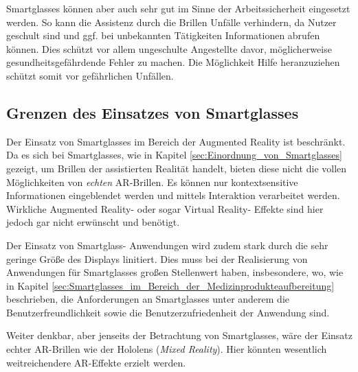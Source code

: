 Smartglasses können aber auch sehr gut im Sinne der Arbeitssicherheit eingesetzt werden. So kann die Assistenz durch die Brillen Unfälle verhindern, da Nutzer geschult sind und ggf. bei unbekannten Tätigkeiten Informationen abrufen können. Dies schützt vor allem ungeschulte Angestellte davor, möglicherweise gesundheitsgefährdende Fehler zu machen. Die Möglichkeit Hilfe heranzuziehen schützt somit vor gefährlichen Unfällen.
%
%
\subsection{Grenzen des Einsatzes von Smartglasses}
\label{sec:Grenzen_des_Einsatzes_von_Smartglasses}
Der Einsatz von Smartglasses im Bereich der Augmented Reality ist beschränkt. Da es sich bei Smartglasses, wie in Kapitel \ref{sec:Einordnung_von_Smartglasses} gezeigt, um Brillen der assistierten Realität handelt, bieten diese nicht die vollen Möglichkeiten von \emph{echten} AR-Brillen. Es können nur kontextsensitive Informationen eingeblendet werden und mittels Interaktion verarbeitet werden. Wirkliche Augmented Reality- oder sogar Virtual Reality- Effekte sind hier jedoch gar nicht erwünscht und benötigt.

Der Einsatz von Smartglass- Anwendungen wird zudem stark durch die sehr geringe Größe des Displays linitiert. Dies muss bei der Realisierung von Anwendungen für Smartglasses großen Stellenwert haben, insbesondere, wo, wie in Kapitel \ref{sec:Smartglasses_im_Bereich_der_Medizinprodukteaufbereitung} beschrieben, die Anforderungen an Smartglasses unter anderem die Benutzerfreundlichkeit sowie die Benutzerzufriedenheit der Anwendung sind.

Weiter denkbar, aber jenseits der Betrachtung von Smartglasses, wäre der Einsatz echter AR-Brillen wie der Hololens (\emph{Mixed Reality}). Hier könnten wesentlich weitreichendere AR-Effekte erzielt werden.

